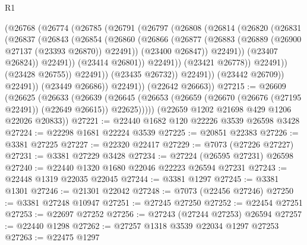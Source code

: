 \begin{lexlean}{R1}
\begin{coremodule}
                        (@26768
                          (@26774
                            (@26785
                              (@26791
                                (@26797
                                  (@26808
                                    (@26814
                                      (@26820
                                        (@26831
                                          (@26837
                                            (@26843
                                              (@26854
                                                (@26860
                                                  (@26866
                                                    (@26877
                                                      (@26883
                                                        (@26889
                                                          (@26900 @27137 (@23393 @26870))
                                                          @22491))
                                                      (@23400 @26847))
                                                    @22491))
                                                (@23407 @26824))
                                              @22491))
                                          (@23414 @26801))
                                        @22491))
                                    (@23421 @26778))
                                  @22491))
                              (@23428 @26755))
                            @22491))
                        (@23435 @26732))
                      @22491))
                  (@23442 @26709))
                @22491))
            (@23449 @26686))
          @22491))
      (@22642 @26663))
@27215 := @26609
    (@26625
      (@26633
        (@26639
          (@26645 (@26653 (@26659 (@26670 (@26676 (@27195 @22491)) (@22649 @26615)) @22625)))))
      (@22659 @1202 @21698 @429 @1206 @22026 @20833))
@27221 := @22440 @1682 @120 @22226 @3539 @26598 @3428
@27224 := @22298 @1681 @22224 @3539
@27225 := @20851 @22383
@27226 := @3381 @27225
@27227 := @22320 @22417
@27229 := @7073 (@27226 @27227)
@27231 := @3381 @27229 @3428
@27234 := @27224 (@26595 @27231) @26598
@27240 := @22440 @1320 @1680 @22046 @22223 @26594 @27231
@27243 := @22448 @1319 @22035 @22045
@27244 := @3381 @1297
@27245 := @3381 @1301
@27246 := @21301 @22042
@27248 := @7073 (@22456 @27246)
@27250 := @3381 @27248 @10947
@27251 := @27245 @27250
@27252 := @22454 @27251
@27253 := @22697 @27252
@27256 := @27243 (@27244 @27253) @26594
@27257 := @22440 @1298
@27262 := @27257 @1318 @3539 @22034 @1297 @27253
@27263 := @22475 @1297

\end{coremodule}
\end{lexlean}
